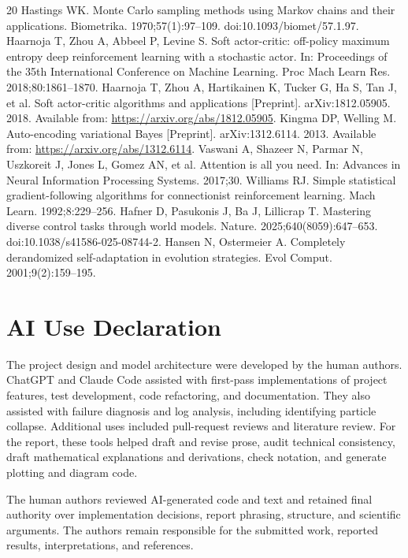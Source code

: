 \documentclass[12pt]{article}
\begin{document}
\begin{thebibliography}{20}
 Hastings WK. Monte Carlo sampling methods using Markov chains and their applications. Biometrika. 1970;57(1):97--109. doi:10.1093/biomet/57.1.97.
 Haarnoja T, Zhou A, Abbeel P, Levine S. Soft actor-critic: off-policy maximum entropy deep reinforcement learning with a stochastic actor. In: Proceedings of the 35th International Conference on Machine Learning. Proc Mach Learn Res. 2018;80:1861--1870.
 Haarnoja T, Zhou A, Hartikainen K, Tucker G, Ha S, Tan J, et al. Soft actor-critic algorithms and applications [Preprint]. arXiv:1812.05905. 2018. Available from: \url{https://arxiv.org/abs/1812.05905}.
 Kingma DP, Welling M. Auto-encoding variational Bayes [Preprint]. arXiv:1312.6114. 2013. Available from: \url{https://arxiv.org/abs/1312.6114}.
 Vaswani A, Shazeer N, Parmar N, Uszkoreit J, Jones L, Gomez AN, et al. Attention is all you need. In: Advances in Neural Information Processing Systems. 2017;30.
 Williams RJ. Simple statistical gradient-following algorithms for connectionist reinforcement learning. Mach Learn. 1992;8:229--256.
 Hafner D, Pasukonis J, Ba J, Lillicrap T. Mastering diverse control tasks through world models. Nature. 2025;640(8059):647--653. doi:10.1038/s41586-025-08744-2.
 Hansen N, Ostermeier A. Completely derandomized self-adaptation in evolution strategies. Evol Comput. 2001;9(2):159--195.
\end{thebibliography}

\section*{AI Use Declaration}
The project design and model architecture were developed by the human authors. ChatGPT and Claude Code assisted with first-pass implementations of project features, test development, code refactoring, and documentation. They also assisted with failure diagnosis and log analysis, including identifying particle collapse. Additional uses included pull-request reviews and literature review. For the report, these tools helped draft and revise prose, audit technical consistency, draft mathematical explanations and derivations, check notation, and generate plotting and diagram code.

The human authors reviewed AI-generated code and text and retained final authority over implementation decisions, report phrasing, structure, and scientific arguments. The authors remain responsible for the submitted work, reported results, interpretations, and references.
\end{document}
